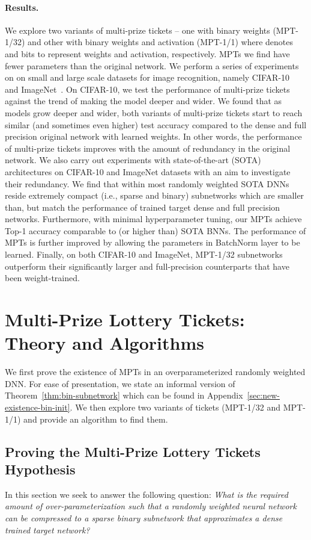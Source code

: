 \documentclass{article} \usepackage{iclr2021_conference,times}
\begin{document}
\paragraph{Results.}
We explore two variants of multi-prize tickets -- one with binary weights (MPT-1/32) and other with binary weights and activation (MPT-1/1) where  denotes  and  bits to represent weights and activation, respectively. MPTs we find have  fewer parameters than the original network. 
We perform a series of experiments on on small and large scale datasets for image recognition, namely CIFAR-10~\citep{krizhevsky2009learning} and ImageNet~\citep{deng2009imagenet}. 
On CIFAR-10, we test the performance of multi-prize tickets against the trend of making the model deeper and wider. We found that as models grow deeper and wider, both variants of multi-prize tickets start to reach similar (and sometimes even higher) test accuracy compared to the dense and full precision original network with learned weights. 
In other words, the performance of multi-prize tickets improves with the amount of redundancy in the original network.  
We also carry out experiments with state-of-the-art (SOTA) architectures on CIFAR-10 and ImageNet datasets with an aim to investigate their redundancy. We find that within most randomly weighted SOTA DNNs reside extremely compact (i.e., sparse and binary) subnetworks which are smaller than, but match the performance of trained target dense and full precision networks. Furthermore, with minimal hyperparameter tuning, our MPTs achieve Top-1 accuracy comparable to (or higher than) SOTA BNNs.
The performance of MPTs is further improved by allowing the parameters in BatchNorm layer to be learned.
Finally, on both CIFAR-10 and ImageNet, MPT-1/32 subnetworks outperform their significantly larger and full-precision counterparts that have been weight-trained. 




\section{Multi-Prize Lottery Tickets: Theory and Algorithms}
We first prove the existence of MPTs in an overparameterized randomly weighted DNN. For ease of presentation, we state an informal version of Theorem~\ref{thm:bin-subnetwork} which can be found in Appendix~\ref{sec:new-existence-bin-init}. We then explore two variants of tickets (MPT-1/32 and MPT-1/1) and provide an algorithm to find them. 

\subsection{Proving the Multi-Prize Lottery Tickets Hypothesis} \label{sec:proving-mplth}
In this section we seek to answer the following question: \emph{What is the required amount of over-parameterization such that a randomly weighted neural network can be compressed to a sparse binary subnetwork that approximates a dense trained target network?}
\end{document}
